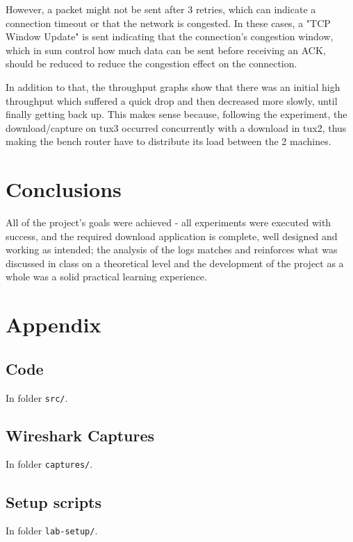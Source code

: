 \documentclass[11pt,a4paper,twocolumn]{article}
\begin{document}
However, a packet might not be sent after 3 retries, which can indicate a connection timeout or that the network is congested. In these cases, a "TCP Window Update" is sent indicating that the connection's congestion window, which in sum control how much data can be sent before receiving an ACK, should be reduced to reduce the congestion effect on the connection.

In addition to that, the throughput graphs show that there was an initial high throughput which suffered a quick drop and then decreased more slowly, until finally getting back up. This makes sense because, following the experiment, the download/capture on tux3 occurred concurrently with a download in tux2, thus making the bench router have to distribute its load between the 2 machines.

\section{Conclusions}

All of the project's goals were achieved - all experiments were executed with success, and the required download application is complete, well designed and working as intended; the analysis of the logs matches and reinforces what was discussed in class on a theoretical level and the development of the project as a whole was a solid practical learning experience.

\onecolumn
\appendix
\section{Appendix}

\subsection{Code}

\noindent In folder \lstinline{src/}.

\subsection{Wireshark Captures}

\noindent In folder \lstinline{captures/}.

\subsection{Setup scripts}

\noindent In folder \lstinline{lab-setup/}.
\end{document}
